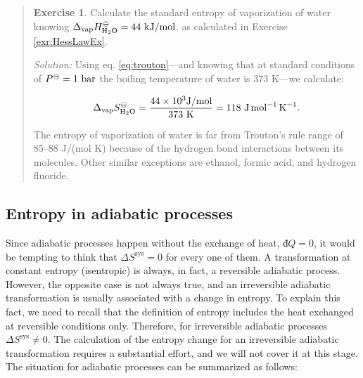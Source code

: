 \documentclass[
  9pt,
]{extbook}
\theoremstyle{definition}
\theoremstyle{definition}
\theoremstyle{definition}
\newtheorem{exercise}{Exercise}[chapter]
\theoremstyle{remark}
\begin{document}
\begin{quote}
\begin{exercise}
\protect\hypertarget{exr:troutonex}{}{\label{exr:troutonex} }Calculate the standard entropy of vaporization of water knowing \(\Delta_{\mathrm{vap}} H_{\mathrm{H}_2\mathrm{O}}^{-\kern-6pt{\ominus}\kern-6pt-}= 44 \  \text{kJ/mol}\), as calculated in Exercise \ref{exr:HessLawEx}.

\emph{Solution:} Using eq. \eqref{eq:trouton}---and knowing that at standard conditions of \(P^{-\kern-6pt{\ominus}\kern-6pt-}= 1 \  \text{bar}\) the boiling temperature of water is 373 K---we calculate:

\begin{equation}
\Delta_{\mathrm{vap}} S_{\mathrm{H}_2\mathrm{O}}^{-\kern-6pt{\ominus}\kern-6pt-}= \frac{44 \times 10^3 \text{J/mol}}{373 \ \text{K}} = 118 \  \text{J} \, \text{mol}^{-1} \, \text{K}^{-1}.
\label{eq:trouton1}
\end{equation}

The entropy of vaporization of water is far from Trouton's rule range of 85--88 J/(mol K) because of the hydrogen bond interactions between its molecules. Other similar exceptions are ethanol, formic acid, and hydrogen fluoride.
\end{exercise}
\end{quote}

\hypertarget{entropy-in-adiabatic-processes}{%
\subsection{Entropy in adiabatic processes}\label{entropy-in-adiabatic-processes}}

Since adiabatic processes happen without the exchange of heat, \(đQ=0\), it would be tempting to think that \(\Delta S^{\mathrm{sys}} = 0\) for every one of them. A transformation at constant entropy (isentropic) is always, in fact, a reversible adiabatic process. However, the opposite case is not always true, and an irreversible adiabatic transformation is usually associated with a change in entropy. To explain this fact, we need to recall that the definition of entropy includes the heat exchanged at reversible conditions only. Therefore, for irreversible adiabatic processes \(\Delta S^{\mathrm{sys}} \neq 0\). The calculation of the entropy change for an irreversible adiabatic transformation requires a substantial effort, and we will not cover it at this stage. The situation for adiabatic processes can be summarized as follows:
\end{document}
